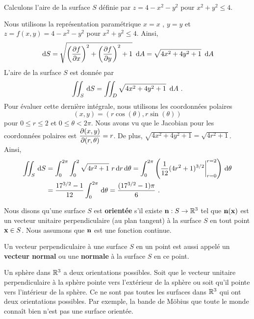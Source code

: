 {\begin{egg}
Calculons l'aire de la surface $S$ définie par $z = 4 - x^2 - y^2$ pour
$x^2 + y^2 \leq 4$.

Nous utilisons la représentation paramétrique $x = x$ , $y = y$ et
$z = f(x,y) = 4 - x^2 - y^2$ pour $x^2 + y^2 \leq 4$.   Ainsi,
\[
\,\mathrm{d}S = \sqrt{ \left(\frac{\partial f}{\partial x}\right)^2 +
  \left(\frac{\partial f}{\partial y}\right)^2 + 1}\ \,\mathrm{d}A
  = \sqrt{ 4x^2 + 4y^2 + 1}\ \,\mathrm{d}A
\]
L'aire de la surface $S$ est donnée par
\[
  \iint_S \,\mathrm{d}S = \iint_D \sqrt{ 4x^2 + 4y^2 + 1}\ \,\mathrm{d}A \ .
\]
Pour évaluer cette dernière intégrale, nous utilisons les coordonnées
polaires
\[
  (x,y) = (r \cos(\theta), r \sin(\theta))
\]
pour $0 \leq r \leq 2$ et $0 \leq \theta < 2\pi$.   Nous avons vu que
le Jacobian pour les coordonnées polaires est
$\displaystyle \frac{\partial(x,y)}{\partial(r,\theta)} = r $.  De
plus, $\sqrt{ 4x^2 + 4y^2 + 1} = \sqrt{4r^2 +1}$.  Ainsi,
\begin{align*}
\iint_S \,\mathrm{d}S &= \int_0^{2\pi} \int_0^2 \sqrt{ 4r^2 + 1}\ r \,\mathrm{d}r
 \,\mathrm{d}\theta
= \int_0^{2\pi} \left(\frac{1}{12} (4r^2 + 1)^{3/2}\bigg|_{r=0}^{r=2} \right)  
 \,\mathrm{d}\theta \\
&= \frac{17^{3/2} -1}{12} \int_0^{2\pi} \,\mathrm{d}\theta
= \frac{(17^{3/2} -1)\pi}{6} \ .
\end{align*}
\end{egg}

\begin{defn} 
Nous disons qu'une surface $S$ est {\bfseries orientée} s'il existe
$\mathbf{n}:S\rightarrow \mathbb{R}^3$ tel que $\mathbf{n}(\mathbf{x})$ est un
vecteur unitaire perpendiculaire (au plan tangent) à la surface
$S$ en tout point $\mathbf{x} \in S$.  Nous assumons que
$\mathbf{n}$ est une fonction continue.
\end{defn}

\begin{defn}
Un vecteur perpendiculaire à une surface $S$ en un point est aussi
appelé un {\bfseries vecteur normal} ou une
{\bfseries normale} à la surface $S$ en ce point. 
\end{defn}

Un sphère dans $\mathbb{R}^3$ a deux orientations possibles.  Soit que le
vecteur unitaire perpendiculaire à la sphère pointe vers l'extérieur
de la sphère ou soit qu'il pointe vers l'intérieur de la sphère.
Ce ne sont pas toutes les surfaces dans $\mathbb{R}^3$ qui ont deux
orientations possibles.  Par exemple, la bande de Möbius que toute le
monde connaît bien n'est pas une surface orientée.

}

